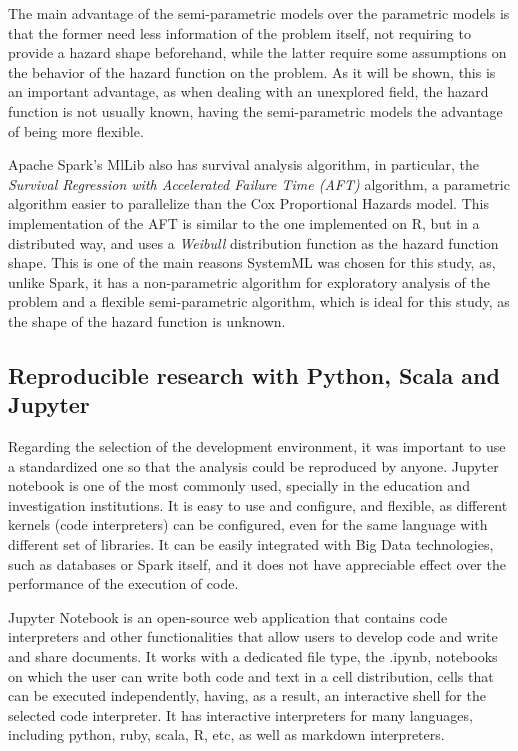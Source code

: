 \documentclass[11pt]{article} %
\begin{document}
      The main advantage of the semi-parametric models over the parametric models is that the former need less information of the problem itself, not requiring to provide a hazard shape beforehand, while the latter require some assumptions on the behavior of the hazard function on the problem. As it will be shown, this is an important advantage, as when dealing with an unexplored field, the hazard function is not usually known, having the semi-parametric models the advantage of being more flexible.

      Apache Spark's MlLib also has survival analysis algorithm, in particular, the \emph{Survival Regression with Accelerated Failure Time (AFT)} algorithm, a parametric algorithm easier to parallelize than the Cox Proportional Hazards model. This implementation of the AFT is similar to the one implemented on R, but in a distributed way, and uses a \emph{Weibull} distribution function as the hazard function shape. This is one of the main reasons SystemML was chosen for this study, as, unlike Spark, it has a non-parametric algorithm for exploratory analysis of the problem and a flexible semi-parametric algorithm, which is ideal for this study, as the shape of the hazard function is unknown.

  \subsection{Reproducible research with Python, Scala and Jupyter}

    Regarding the selection of the development environment, it was important to use a standardized one so that the analysis could be reproduced by anyone. Jupyter notebook is one of the most commonly used, specially in the education and investigation institutions. It is easy to use and configure, and flexible, as different kernels (code interpreters) can be configured, even for the same language with different set of libraries. It can be easily integrated with Big Data technologies, such as databases or Spark itself, and it does not have appreciable effect over the performance of the execution of code.

    Jupyter Notebook is an open-source web application that contains code interpreters and other functionalities that allow users to develop code and write and share documents. It works with a dedicated file type, the .ipynb, notebooks on which the user can write both code and text in a cell distribution, cells that can be executed independently, having, as a result, an interactive shell for the selected code interpreter. It has interactive interpreters for many languages, including python, ruby, scala, R, etc, as well as markdown interpreters.
\end{document}
